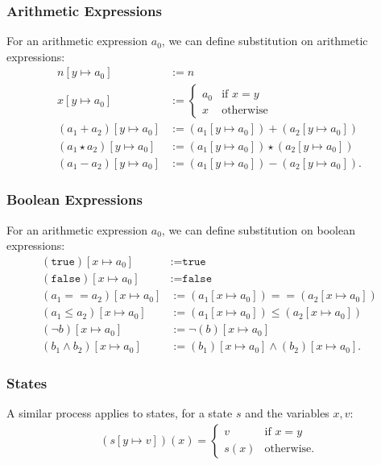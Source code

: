 \documentclass[a4paper, 12pt, twoside]{article}
\begin{document}
\subsubsection{Arithmetic Expressions}

For an arithmetic expression $a_0$, we can define substitution on
arithmetic expressions: \begin{align*}
  n[y \mapsto a_0] &:= n \\
  x[y \mapsto a_0] &:= \begin{cases}
    a_0 & \text{if } x = y \\
    x & \text{otherwise}
  \end{cases} \\
  (a_1 + a_2)[y \mapsto a_0] &:= (a_1[y \mapsto a_0]) + (a_2[y \mapsto a_0]) \\
  (a_1 \star a_2)[y \mapsto a_0] &:= (a_1[y \mapsto a_0]) \star (a_2[y \mapsto a_0]) \\
  (a_1 - a_2)[y \mapsto a_0] &:= (a_1[y \mapsto a_0]) - (a_2[y \mapsto a_0]).
\end{align*}

\subsubsection{Boolean Expressions}

For an arithmetic expression $a_0$, we can define substitution on 
boolean expressions: \begin{align*}
  (\texttt{true})[x \mapsto a_0] &:= \texttt{true} \\
  (\texttt{false})[x \mapsto a_0] &:=  \texttt{false} \\
  (a_1 == a_2)[x \mapsto a_0] &:= (a_1[x \mapsto a_0]) == (a_2[x \mapsto a_0])\\
  (a_1 \leq a_2)[x \mapsto a_0] &:= (a_1[x \mapsto a_0]) \leq (a_2[x \mapsto a_0]) \\
  (\neg b)[x \mapsto a_0] &:= \neg (b)[x \mapsto a_0] \\
  (b_1 \land b_2)[x \mapsto a_0] &:= (b_1)[x \mapsto a_0] \land (b_2)[x \mapsto a_0].
\end{align*}

\subsubsection{States}

A similar process applies to states, for a state $s$ and the variables
$x, v$: \begin{gather*}
  (s[y\mapsto v])(x) = \begin{cases}
    v & \text{if } x = y \\
    s(x) & \text{otherwise}.
  \end{cases}
\end{gather*}
\end{document}
